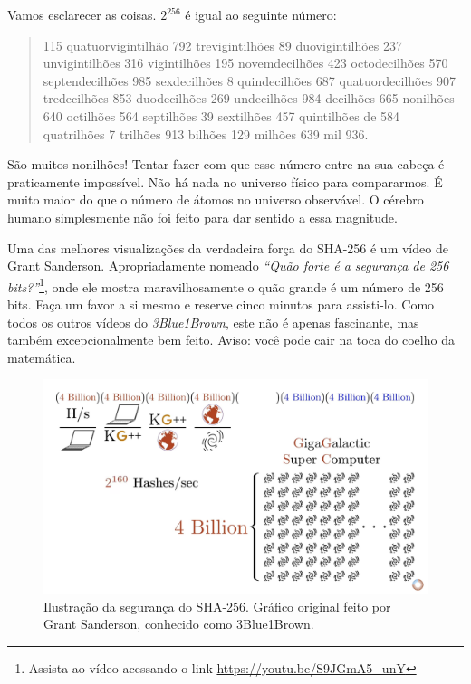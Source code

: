 Vamos esclarecer as coisas. $2^{256}$ é igual ao seguinte número:

\begin{quotation}\begin{samepage}
    115 quatuorvigintilhão 792 trevigintilhões 89 duovigintilhões 237 unvigintilhões 316 vigintilhões 195 novemdecilhões 423 octodecilhões 570 septendecilhões 985 sexdecilhões 8 quindecilhões 687 quatuordecilhões 907 tredecilhões 853 duodecilhões 269 undecilhões 984 decilhões 665 nonilhões 640 octilhões 564 septilhões 39 sextilhões 457 quintilhões de 584 quatrilhões 7 trilhões 913 bilhões 129 milhões 639 mil 936.
\end{samepage}\end{quotation}

São muitos nonilhões! Tentar fazer com que esse número entre na sua cabeça é praticamente impossível. Não há nada no universo físico para compararmos. É muito maior do que o número de átomos no universo observável. O cérebro humano simplesmente não foi feito para dar sentido a essa magnitude.

\newpage

Uma das melhores visualizações da verdadeira força do SHA-256 é um vídeo de Grant Sanderson. Apropriadamente nomeado \textit{\enquote{Quão forte é a segurança de 256 bits?}}\footnote{Assista ao vídeo acessando o link \url{https://youtu.be/S9JGmA5_unY}}, onde ele mostra maravilhosamente o quão grande é um número de 256 bits. Faça um favor a si mesmo e reserve cinco minutos para assisti-lo. Como todos os outros vídeos do \textit{3Blue1Brown}, este não é apenas fascinante, mas também excepcionalmente bem feito. Aviso: você pode cair na toca do coelho da matemática.

\begin{figure}
  \includegraphics{assets/images/youtube-vid-inverted.png}
  \caption{Ilustração da segurança do SHA-256. Gráfico original feito por Grant Sanderson, conhecido como 3Blue1Brown.}
  \label{fig:youtube-vid-inverted}
\end{figure}

